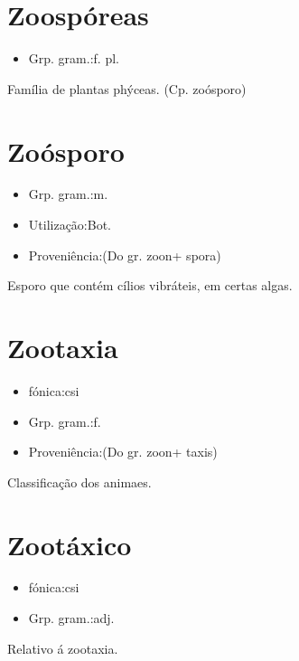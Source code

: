 \section{Zoospóreas}
\begin{itemize}
\item {Grp. gram.:f. pl.}
\end{itemize}
Família de plantas phýceas.
(Cp. \textunderscore zoósporo\textunderscore )
\section{Zoósporo}
\begin{itemize}
\item {Grp. gram.:m.}
\end{itemize}
\begin{itemize}
\item {Utilização:Bot.}
\end{itemize}
\begin{itemize}
\item {Proveniência:(Do gr. \textunderscore zoon\textunderscore  + \textunderscore spora\textunderscore )}
\end{itemize}
Esporo que contém cílios vibráteis, em certas algas.
\section{Zootaxia}
\begin{itemize}
\item {fónica:csi}
\end{itemize}
\begin{itemize}
\item {Grp. gram.:f.}
\end{itemize}
\begin{itemize}
\item {Proveniência:(Do gr. \textunderscore zoon\textunderscore  + \textunderscore taxis\textunderscore )}
\end{itemize}
Classificação dos animaes.
\section{Zootáxico}
\begin{itemize}
\item {fónica:csi}
\end{itemize}
\begin{itemize}
\item {Grp. gram.:adj.}
\end{itemize}
Relativo á zootaxia.
